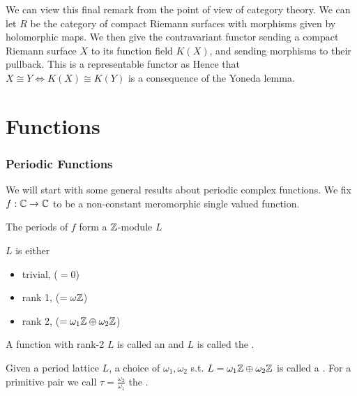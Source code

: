 \documentclass{article}
\begin{document}
\begin{remark}
	We can view this final remark from the point of view of category theory. We can let $R$ be the category of compact Riemann surfaces with morphisms given by holomorphic maps. We then give the contravariant functor 
sending a compact Riemann surface $X$ to its function field $K(X)$, and sending morphisms to their pullback. This is a representable functor as 
Hence that $X \cong Y \Leftrightarrow K(X) \cong K(Y)$ is a consequence of the Yoneda lemma. 
\end{remark}

\part{Functions}

\section{Periodic Functions}
We will start with some general results about periodic complex functions. We fix $f:\mathbb{C} \to \mathbb{C}$ to be a non-constant meromorphic single valued function. 

\begin{lemma}
	The periods of $f$ form a $\mathbb{Z}$-module $L$ 
\end{lemma}

\begin{prop}
	$L$ is either 
	\begin{itemize}
		\item trivial, ($=0$)
		\item rank 1, ($=\omega \mathbb{Z}$)
		\item rank 2, ($=\omega_1 \mathbb{Z} \oplus \omega_2 \mathbb{Z}$)
	\end{itemize}
\end{prop}

\begin{definition}
	A function with rank-2 $L$ is called an  and $L$ is called the . 
\end{definition}

\begin{definition}
	Given a period lattice $L$, a choice of $\omega_1, \omega_2$ s.t.  $L = \omega_1 \mathbb{Z} \oplus \omega_2 \mathbb{Z}$ is called a . For a primitive pair we call $\tau = \frac{\omega_2}{\omega_1}$ the . 
\end{definition}
\end{document}

